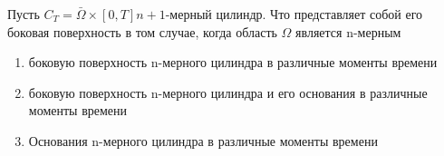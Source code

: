 Пусть \(C_T=\bar{\Omega }\times \left[0,T\right] n+1\)-мерный цилиндр. Что представляет собой его боковая поверхность в том случае, когда область \(\Omega\) является n-мерным

\begin{enumerate}[label=\arabic*)]
    \item боковую поверхность n-мерного цилиндра в различные моменты времени
    \item боковую поверхность n-мерного цилиндра и его основания в различные моменты времени
    \item Основания n-мерного цилиндра в различные моменты времени
\end{enumerate}

